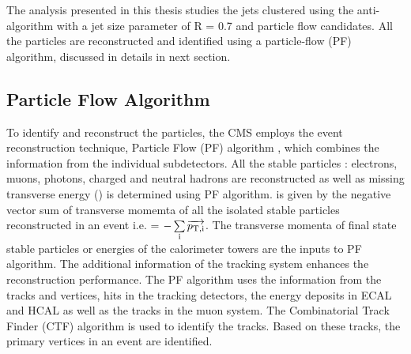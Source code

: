 The analysis presented in this thesis studies the jets clustered using the anti-\kt algorithm with a jet size parameter of R = 0.7 and particle flow candidates. All the particles are reconstructed and identified using a particle-flow (PF) algorithm, discussed in details in next section.

\subsection{Particle Flow Algorithm}
To identify and reconstruct the particles, the CMS employs the event reconstruction technique, Particle Flow (PF) algorithm \cite{CMS:2009nxa, CMS:2010byl}, which combines the information from the individual subdetectors. All the stable particles : electrons, muons, photons, charged and neutral hadrons are reconstructed as well as missing transverse energy (\ETmiss) is determined using PF algorithm. \ETmiss is given by the negative vector sum of transverse momemta \pt of all the isolated stable particles reconstructed in an event i.e. \ETmiss = $-\sum\limits_{\rm i}^{}\overrightarrow{p_{\rm T,i}}$. %
The transverse momenta of final state stable particles or energies of the calorimeter towers are the inputs to PF algorithm. The additional information of the tracking system enhances the reconstruction performance. The PF algorithm uses the information from the tracks and vertices, hits in the tracking detectors, the energy deposits in ECAL and HCAL as well as the tracks in the muon system. The Combinatorial Track Finder (CTF) algorithm \cite{Adam:2005cg} is used to identify the tracks. Based on these tracks, the primary vertices in an event are identified. 






